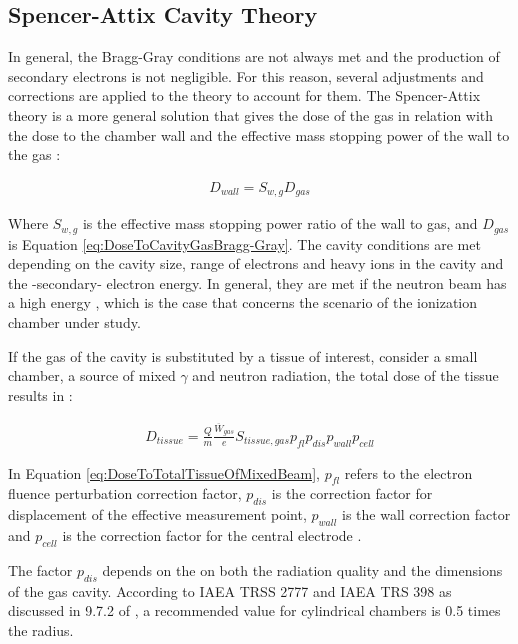 \subsection{Spencer-Attix Cavity Theory}
In general, the Bragg-Gray conditions are not always met and the production of secondary electrons is not negligible. For this reason, several adjustments and corrections are applied to the theory to account for them. The Spencer-Attix theory is a more general solution that gives the dose of the gas in relation with the dose to the chamber wall and the effective mass stopping power of the wall to the gas \cite{aapm1980protocol}:

\begin{align}
\label{eq:DoseToWall}
    {D_{wall} = S_{w,g} D_{gas}}
\end{align}

Where $S_{w,g}$ is the effective mass stopping power ratio of the wall to gas, and $D_{gas}$ is Equation \ref{eq:DoseToCavityGasBragg-Gray}. The cavity conditions are met depending on the cavity size, range of electrons and heavy ions in the cavity and the -secondary- electron energy. In general, they are met if the neutron beam has a high energy \cite{RadiationOncologyInPhysicsHandbook}, which is the case that concerns the scenario of the ionization chamber under study.

If the gas of the cavity is substituted by a tissue of interest, consider a small chamber, a source of mixed $\gamma$ and neutron radiation, the total dose of the tissue results in \cite{RadiationOncologyInPhysicsHandbook}:

\begin{align}
\label{eq:DoseToTotalTissueOfMixedBeam}
    {D_{tissue} = \frac{Q}{m} \frac{\overline W_{gas}}{e} S_{tissue,gas} p_{fl} p_{dis} p_{wall} p_{cell}} 
\end{align}


In Equation \ref{eq:DoseToTotalTissueOfMixedBeam}, $p_{fl}$ refers to the electron fluence perturbation correction factor, $p_{dis}$ is the correction factor for displacement of the effective measurement point, $p_{wall}$ is the wall correction factor and $p_{cell}$ is the correction factor for the central electrode \cite{RadiationOncologyInPhysicsHandbook}.

The factor $p_{dis}$ depends on the on both the radiation quality and the dimensions of the gas cavity. According to IAEA TRSS 2777 and IAEA TRS 398 as discussed in 9.7.2 of \cite{RadiationOncologyInPhysicsHandbook}, a recommended value for cylindrical chambers is 0.5 times the radius. 

